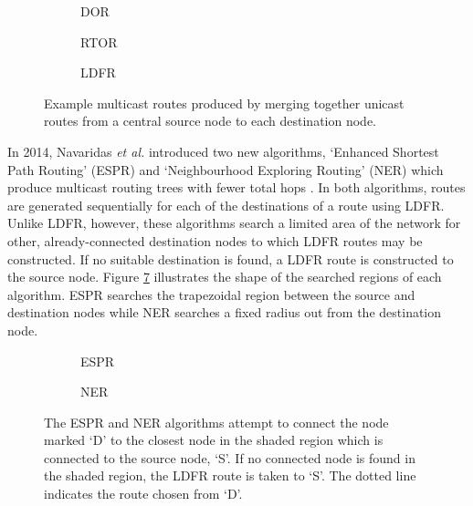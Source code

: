 			\begin{figure}
				\center
				\begin{subfigure}{0.3\linewidth}
					\center
					
					\caption{DOR}
					\label{fig:simple-routers-dor}
				\end{subfigure}
				\begin{subfigure}{0.3\linewidth}
					\center
					
					\caption{RTOR}
					\label{fig:simple-routers-dor}
				\end{subfigure}
				\begin{subfigure}{0.3\linewidth}
					\center
					
					\caption{LDFR}
					\label{fig:simple-routers-dor}
				\end{subfigure}
				
				\caption{Example multicast routes produced by merging together unicast
				routes from a central source node to each destination node.}
				\label{fig:simple-routers}
			\end{figure}
			
			In 2014, Navaridas \emph{et al.} introduced two new algorithms, `Enhanced
			Shortest Path Routing' (ESPR) and `Neighbourhood Exploring Routing' (NER)
			which produce multicast routing trees with fewer total hops
			\cite{navaridas14}. In both algorithms, routes are generated sequentially
			for each of the destinations of a route using LDFR. Unlike LDFR, however,
			these algorithms search a limited area of the network for other,
			already-connected destination nodes to which LDFR routes may be
			constructed. If no suitable destination is found, a LDFR route is
			constructed to the source node. Figure \ref{fig:search-regions} illustrates
			the shape of the searched regions of each algorithm. ESPR searches the
			trapezoidal region between the source and destination nodes while NER
			searches a fixed radius out from the destination node.
			
			\begin{figure}
				\center
				\begin{subfigure}{0.45\linewidth}
					\center
					
					\caption{ESPR}
					\label{fig:search-regions-espr}
				\end{subfigure}
				\begin{subfigure}{0.45\linewidth}
					\center
					
					\caption{NER}
					\label{fig:search-regions-espr}
				\end{subfigure}
				
				\caption{The ESPR and NER algorithms attempt to connect the node marked
				`D' to the closest node in the shaded region which is connected to the
				source node, `S'. If no connected node is found in the shaded region, the
				LDFR route is taken to `S'. The dotted line indicates the route chosen
				from `D'.}
				\label{fig:search-regions}
			\end{figure}
			
